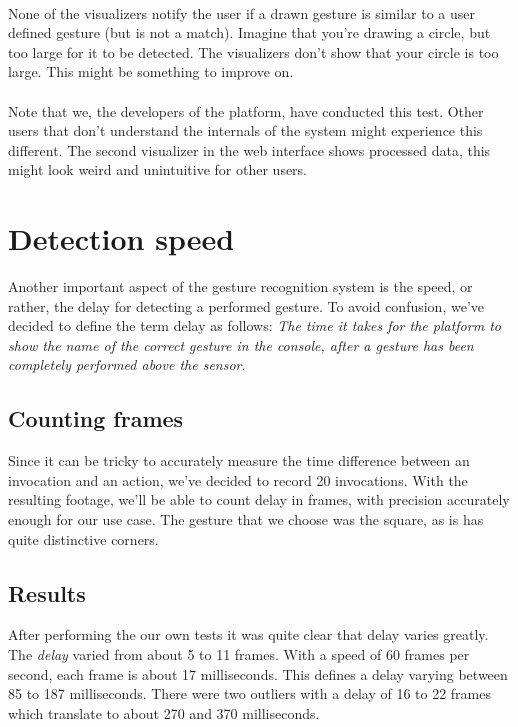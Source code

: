 \documentclass[a4paper]{article}
\begin{document}
  \paragraph{}
  None of the visualizers notify the user if a drawn gesture is similar to a
  user defined gesture (but is not a match). Imagine that you're drawing a
  circle, but too large for it to be detected. The visualizers don't show that
  your circle is too large. This might be something to improve on.

  \paragraph{}
  Note that we, the developers of the platform, have conducted this test. Other
  users that don't understand the internals of the system might experience this
  different. The second visualizer in the web interface shows processed data,
  this might look weird and unintuitive for other users.

  \clearpage

  \section{Detection speed}
  Another important aspect of the gesture recognition system is the speed, or
  rather, the delay for detecting a performed gesture. To avoid confusion, we've
  decided to define the term delay as follows: \textit{The time it takes for the
    platform to show the name of the correct gesture in the console, after a
    gesture has been completely performed above the sensor}.

  \subsection{Counting frames}
  Since it can be tricky to accurately measure the time difference between an
  invocation and an action, we've decided to record 20 invocations.
  With the resulting footage, we'll be able to count delay in
  frames, with precision accurately enough for our use case. The gesture that we
  choose was the square, as is has quite distinctive corners.

  \subsection{Results}
  After performing the our own tests it was quite clear that delay varies
  greatly. The \emph{delay} varied from about 5 to 11 frames. With a speed of 60
  frames per second, each frame is about 17 milliseconds. This defines a delay
  varying between 85 to 187 milliseconds. There were two outliers with a delay
  of 16 to 22 frames which translate to about 270 and 370 milliseconds.
\end{document}
